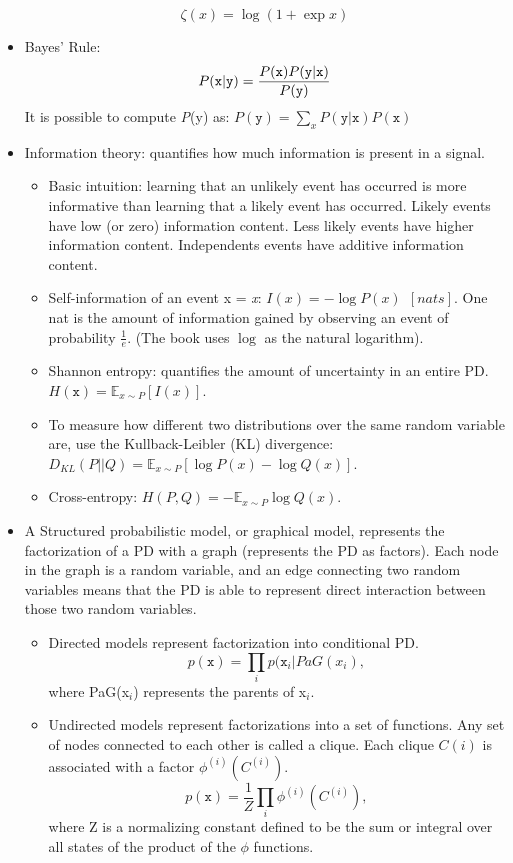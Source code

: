 \documentclass{article}
\begin{document}
\begin{itemize}
\[
	\zeta(x) = \log{(1 + \exp{x})}
\]
\item Bayes' Rule:
\[
	P(\mathtt{x} | \mathtt{y}) = \frac{P(\mathtt{x})P(\mathtt{y} | \mathtt{x})}{P(\mathtt{y})}\\
\]
It is possible to compute \textit{P}(y) as: \(P(\mathtt{y}) = \sum_{x}P(\mathtt{y} | \mathtt{x})P(\mathtt{x})\)
\item Information theory: quantifies how much information is present in a signal.
\begin{itemize}
\item Basic intuition: learning that an unlikely event has occurred is more informative than learning that a likely event has occurred. Likely events have low (or zero) information content. Less likely events have higher information content. Independents events have additive information content.
\item Self-information of an event x = \textit{x}: \(I(x) = - \log{P(x)}\ \ [nats]\). One nat is the amount of information gained by observing an event of probability \(\frac{1}{e}\). (The book uses \(\log\) as the natural logarithm).
\item Shannon entropy: quantifies the amount of uncertainty in an entire PD. \(H(\mathtt{x}) = \mathbb{E}_{x\sim P}[I(x)]\).
\item To measure how different two distributions over the same random variable are, use the Kullback-Leibler (KL) divergence: \(D_{KL}(P||Q) = \mathbb{E}_{x\sim P}[\log{P(x)} - \log{Q(x)}]\).
\item Cross-entropy: \(H(P, Q) = -\mathbb{E}_{x\sim P}\log{Q(x)}\).
\end{itemize}
\item A Structured probabilistic model, or graphical model, represents the factorization of a PD with a graph (represents the PD as factors). Each node in the graph is a random variable, and an edge connecting two random variables means that the PD is able to represent direct interaction between those two random variables. 
\begin{itemize}
\item Directed models represent factorization into conditional PD.\\ \[p(\mathtt{x}) = \prod_i{p(\mathtt{x}_i | PaG(x_i)},\] where PaG(x\(_i\)) represents the parents of x\(_i\).
\item Undirected models represent factorizations into a set of functions. Any set of nodes connected to each other is called a clique. Each clique \(C{(i)}\) is associated with a factor \(\phi^{(i)}(C^{(i)})\).
\[
	p(\mathtt{x}) = \frac{1}{Z}\prod_i \phi^{(i)}(C^{(i)}),
\]
where Z is a normalizing constant defined to be the sum or integral over all states of the product of the \(\phi\) functions.
\end{itemize}
\end{itemize}
\end{document}
